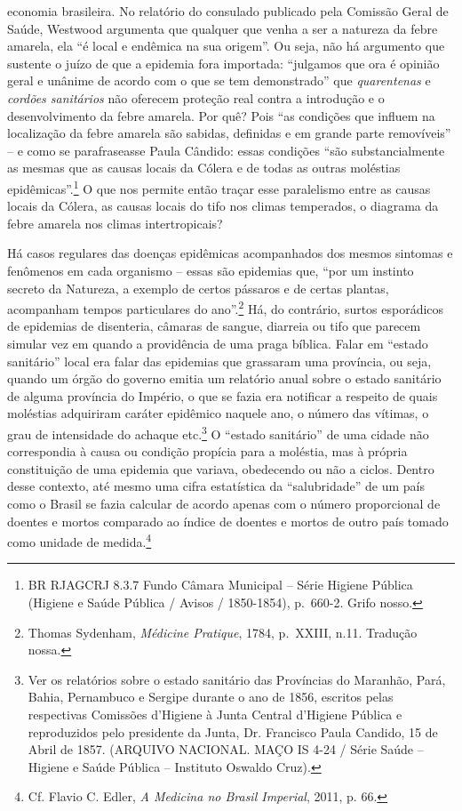 economia brasileira. No relatório do consulado publicado pela Comissão
Geral de Saúde, Westwood argumenta que qualquer que venha a ser a
natureza da febre amarela, ela ``é local e endêmica na sua origem''. Ou
seja, não há argumento que sustente o juízo de que a epidemia fora
importada: ``julgamos que ora é opinião geral e unânime de acordo com o
que se tem demonstrado'' que \emph{quarentenas} e \emph{cordões
sanitários} não oferecem proteção real contra a introdução e o
desenvolvimento da febre amarela. Por quê? Pois ``as condições que
influem na localização da febre amarela são sabidas, definidas e em
grande parte removíveis'' -- e como se parafraseasse Paula Cândido:
essas condições ``são substancialmente as mesmas que as causas locais da
Cólera e de todas as outras moléstias epidêmicas''.\footnote{BR RJAGCRJ
  8.3.7 Fundo Câmara Municipal -- Série Higiene Pública (Higiene e Saúde
  Pública / Avisos / 1850-1854), p.~660-2. Grifo nosso.} O que nos
permite então traçar esse paralelismo entre as causas locais da Cólera,
as causas locais do tifo nos climas temperados, o diagrama da febre
amarela nos climas intertropicais?

Há casos regulares das doenças epidêmicas acompanhados dos mesmos
sintomas e fenômenos em cada organismo -- essas são epidemias que, ``por
um instinto secreto da Natureza, a exemplo de certos pássaros e de
certas plantas, acompanham tempos particulares do ano''.\footnote{Thomas
  Sydenham, \emph{Médicine Pratique}, 1784, p.~XXIII, n.11. Tradução
  nossa.} Há, do contrário, surtos esporádicos de epidemias de
disenteria, câmaras de sangue, diarreia ou tifo que parecem simular vez
em quando a providência de uma praga bíblica. Falar em ``estado
sanitário'' local era falar das epidemias que grassaram uma província,
ou seja, quando um órgão do governo emitia um relatório anual sobre o
estado sanitário de alguma província do Império, o que se fazia era
notificar a respeito de quais moléstias adquiriram caráter epidêmico
naquele ano, o número das vítimas, o grau de intensidade do achaque
etc.\footnote{Ver os relatórios sobre o estado sanitário das Províncias
  do Maranhão, Pará, Bahia, Pernambuco e Sergipe durante o ano de 1856,
  escritos pelas respectivas Comissões d'Higiene à Junta Central
  d'Higiene Pública e reproduzidos pelo presidente da Junta, Dr.
  Francisco Paula Candido, 15 de Abril de 1857. (ARQUIVO NACIONAL. MAÇO
  IS 4-24 / Série Saúde -- Higiene e Saúde Pública -- Instituto Oswaldo
  Cruz).} O ``estado sanitário'' de uma cidade não correspondia à causa
ou condição propícia para a moléstia, mas à própria constituição de uma
epidemia que variava, obedecendo ou não a ciclos. Dentro desse contexto,
até mesmo uma cifra estatística da ``salubridade'' de um país como o
Brasil se fazia calcular de acordo apenas com o número proporcional de
doentes e mortos comparado ao índice de doentes e mortos de outro país
tomado como unidade de medida.\footnote{Cf. Flavio C. Edler, \emph{A
  Medicina no Brasil Imperial}, 2011, p. 66.}

